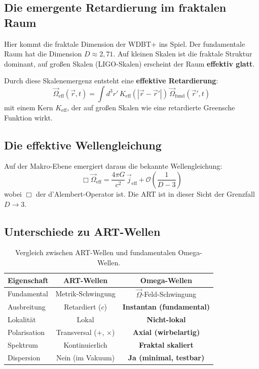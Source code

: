\documentclass[12pt,a4paper]{article}
\begin{document}
\subsection{Die emergente Retardierung im fraktalen Raum}

Hier kommt die fraktale Dimension der WDBT+ ins Spiel. Der fundamentale Raum hat die Dimension $D \approx 2,71$. Auf kleinen Skalen ist die fraktale Struktur dominant, auf großen Skalen (LIGO-Skalen) erscheint der Raum \textbf{effektiv glatt}.

Durch diese Skalenemergenz entsteht eine \textbf{effektive Retardierung}:
\begin{equation}
\vec{\Omega}_{\text{eff}}(\vec{r}, t) = \int d^3r' \, K_{\text{eff}}(|\vec{r} - \vec{r}'|) \, \vec{\Omega}_{\text{fund}}(\vec{r}', t)
\end{equation}
mit einem Kern $K_{\text{eff}}$, der auf großen Skalen wie eine retardierte Greensche Funktion wirkt.

\subsection{Die effektive Wellengleichung}

Auf der Makro-Ebene emergiert daraus die bekannte Wellengleichung:
\begin{equation}
\boxed{ \Box \vec{\Omega}_{\text{eff}} = \frac{4\pi G}{c^2} \, \vec{j}_{\text{eff}} + \mathcal{O}\left(\frac{1}{D-3}\right) }
\end{equation}
wobei $\Box$ der d'Alembert-Operator ist. Die ART ist in dieser Sicht der Grenzfall $D \to 3$.

\subsection{Unterschiede zu ART-Wellen}

\begin{table}[h!]
\centering
\begin{tabular}{|l|c|c|}
\hline
\textbf{Eigenschaft} & \textbf{ART-Wellen} & \textbf{Omega-Wellen} \\
\hline
Fundamental & Metrik-Schwingung & $\vec{\Omega}$-Feld-Schwingung \\
Ausbreitung & Retardiert ($c$) & \textbf{Instantan (fundamental)} \\
Lokalität & Lokal & \textbf{Nicht-lokal} \\
Polarisation & Transversal (+, $\times$) & \textbf{Axial (wirbelartig)} \\
Spektrum & Kontinuierlich & \textbf{Fraktal skaliert} \\
Dispersion & Nein (im Vakuum) & \textbf{Ja (minimal, testbar)} \\
\hline
\end{tabular}
\caption{Vergleich zwischen ART-Wellen und fundamentalen Omega-Wellen.}
\end{table}
\end{document}
